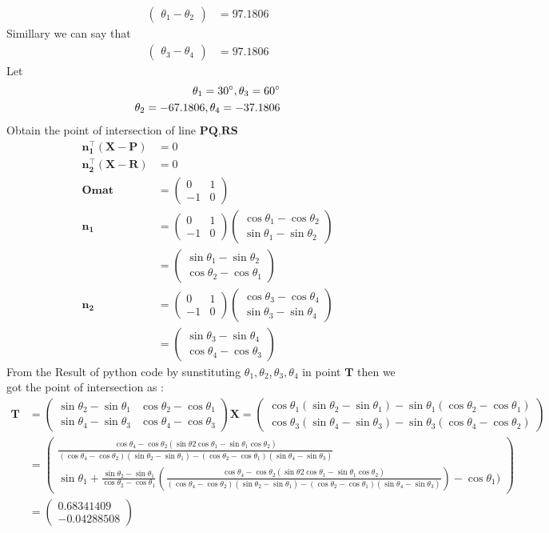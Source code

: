 \documentclass[12pt]{article}
\newcommand{\myvec}[1]{\ensuremath{\begin{pmatrix}#1\end{pmatrix}}}
\let\vec\mathbf
\begin{document}
\begin{align}
	\myvec{{\theta_1}-{\theta_2}}&=97.1806
	\end{align}
Simillary we can say that
\begin{align}
	\myvec{{\theta_3}-{\theta_4}}&=97.1806 		       
\end{align}	
Let
\begin{align}
{\theta_1=30\degree},{\theta_3=60\degree}\\
{\theta_2=-67.1806},{\theta_4=-37.1806}
\end{align}
Obtain the point of intersection of line $\vec{PQ}$,$\vec{RS}$
\begin{align}
\vec{n_1^{\top}}(\vec{X}-\vec{P})&=0\\
\vec{n_2^{\top}}(\vec{X}-\vec{R})&=0\\
\vec{Omat}&=\myvec{0&1\\-1&0}\\
\vec{n_1}&=\myvec{0&1\\-1&0}\myvec{\cos{\theta_1}-\cos{\theta_2}\\\sin{\theta_1}-\sin{\theta_2}}\\
&=\myvec{\sin{\theta_1}-\sin{\theta_2}\\\cos{\theta_2}-\cos{\theta_1}}\\
\vec{n_2}&=\myvec{0&1\\-1&0}\myvec{\cos{\theta_3}-\cos{\theta_4}\\\sin{\theta_3}-\sin{\theta_4}}\\
&=\myvec{\sin{\theta_3}-\sin{\theta_4}\\\cos{\theta_4}-\cos{\theta_3}}
\end{align}
From the Result of python code by sunstituting $\theta_1,\theta_2,\theta_3,\theta_4$ in point $\vec{T}$ then we got the point of intersection as :
\begin{align}
\vec{T}&=\myvec{\sin{\theta_2}-\sin{\theta_1}&\cos{\theta_2}-\cos{\theta_1}\\\sin{\theta_4}-\sin{\theta_3}&\cos{\theta_4}-\cos{\theta_3}}\vec{X}=\myvec{\cos{\theta_1}(\sin{\theta_2}-\sin{\theta_1})-\sin{\theta_1}(\cos{\theta_2}-\cos{\theta_1})\\\cos\theta_3(\sin\theta_4-\sin\theta_3)-\sin\theta_3(\cos\theta_4-\cos\theta_2)}\\
&=\myvec{\frac{\cos{\theta_4}-\cos{\theta_2}(\sin{\theta2}\cos{\theta_1}-\sin{\theta_1}\cos{\theta_2})}{(\cos{\theta_4}-\cos{\theta_2})(\sin{\theta_2}-\sin{\theta_1})-(\cos{\theta_2}-\cos{\theta_1})(\sin{\theta_4}-\sin{\theta_3})}\\[8pt]\sin{\theta_1}+\frac{\sin{\theta_2}-\sin{\theta_1}}{\cos{\theta_2}-\cos{\theta_1}}(\frac{\cos{\theta_4}-\cos{\theta_2}(\sin{\theta2}\cos{\theta_1}-\sin{\theta_1}\cos{\theta_2})}{(\cos{\theta_4}-\cos{\theta_2})(\sin{\theta_2}-\sin{\theta_1})-(\cos{\theta_2}-\cos{\theta_1})(\sin{\theta_4}-\sin{\theta_3})})-\cos{\theta_1})}\\
&=\myvec{0.68341409\\-0.04288508}
\end{align}
\end{document}
